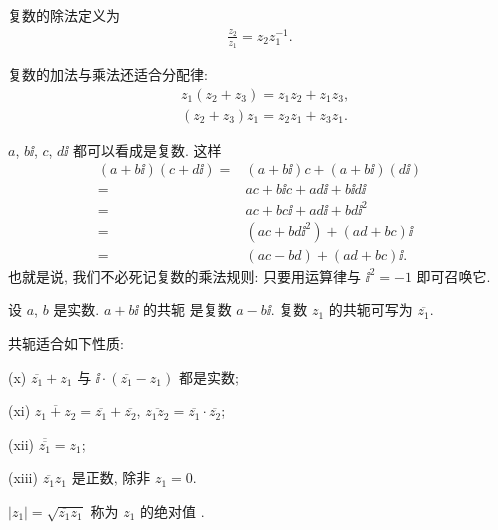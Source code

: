 \begin{definition}
    复数的除法定义为
    \begin{align*}
        \frac{z_2}{z_1} = z_2 z_1^{-1}.
    \end{align*}
\end{definition}

\begin{proposition}
    复数的加法与乘法还适合分配律:
    \begin{align*}
         & z_1 (z_2 + z_3) = z_1 z_2 + z_1 z_3, \\
         & (z_2 + z_3) z_1 = z_2 z_1 + z_3 z_1.
    \end{align*}
\end{proposition}

\begin{remark}
    $a$, $b\ii$, $c$, $d\ii$ 都可以看成是复数. 这样
    \begin{align*}
        (a + b \ii) (c + d \ii)
        = {} & (a + b \ii) c + (a + b \ii) (d \ii)  \\
        = {} & ac + b \ii c + a d \ii + b \ii d \ii \\
        = {} & ac + bc\ii + ad\ii + bd\ii^2         \\
        = {} & (ac + bd\ii^2) + (ad + bc)\ii        \\
        = {} & (ac - bd) + (ad + bc)\ii.
    \end{align*}
    也就是说, 我们不必死记复数的乘法规则: 只要用运算律与 $\ii^2 = -1$ 即可召唤它.
\end{remark}

\begin{definition}
    设 $a$, $b$ 是实数. $a + b\ii$ 的共轭  是复数 $a - b\ii$. 复数 $z_1$ 的共轭可写为 $\overline{z_1}$.
\end{definition}

\begin{proposition}
    共轭适合如下性质:

    (x) $\overline{z_1} + z_1$ 与 $\ii \cdot (\overline{z_1} - z_1)$ 都是实数;

    (xi) $\overline{z_1 + z_2} = \overline{z_1} + \overline{z_2}$, $\overline{z_1 z_2} = \overline{z_1} \cdot \overline{z_2}$;

    (xii) $\overline{\overline{z_1}} = z_1$;

    (xiii) $\overline{z_1} z_1$ 是正数, 除非 $z_1 = 0$.
\end{proposition}

\begin{definition}
    $|z_1| = \sqrt{\overline{z_1} z_1}$ 称为 $z_1$ 的绝对值 .
\end{definition}

